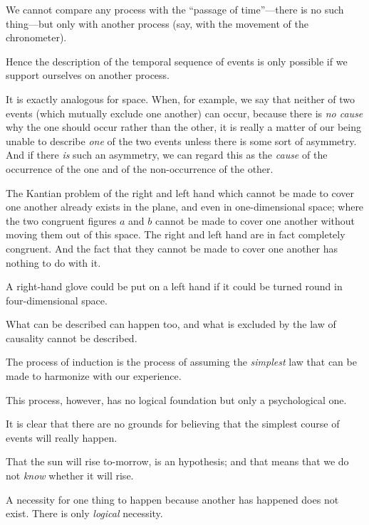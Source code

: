 {We cannot compare any process with the
``passage of time''---there is no such thing---but
only with another process (say, with the movement
of the chronometer).

Hence the description of the temporal sequence
of events is only possible if we support ourselves
on another process.

It is exactly analogous for space. When, for
example, we say that neither of two events (which
mutually exclude one another) can occur, because
there is \emph{no cause} why the one should occur rather
than the other, it is really a matter of our being
unable to describe \emph{one} of the two events unless
there is some sort of asymmetry. And if there \emph{is}
such an asymmetry, we can regard this as the
\emph{cause} of the occurrence of the one and of the non-occurrence
of the other.}


{The Kantian problem of the right and left hand
which cannot be made to cover one another already
exists in the plane, and even in one-di\-men\-sio\-nal
space; where the two congruent figures $a$ and $b$
cannot be made to cover one another without
moving them out of this space. The right and
left hand are in fact completely congruent. And
the fact that they cannot be made to cover one
another has nothing to do with it.

A right-hand glove could be put on a left hand
if it could be turned round in four-dimensional
space.}


{What can be described can happen too, and
what is excluded by the law of causality cannot be
described.}


{The process of induction is the process of
assuming the \emph{simplest} law that can be made to
harmonize with our experience.}


{This process, however, has no logical foundation
but only a psychological one.

It is clear that there are no grounds for believing
that the simplest course of events will really
happen.}


{That the sun will rise to-morrow, is an hypothesis;
and that means that we do not \emph{know} whether
it will rise.}


{A necessity for one thing to happen because
another has happened does not exist. There is
only \emph{logical} necessity.}



